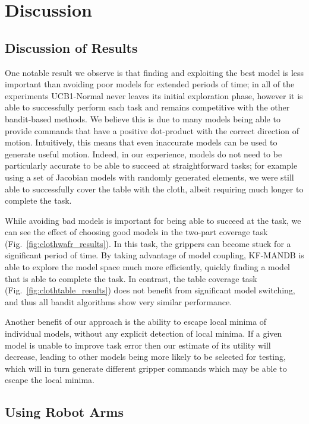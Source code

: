 \section{Discussion}

\subsection{Discussion of Results}

One notable result we observe is that finding and exploiting the best model is less important than avoiding poor models for extended periods of time; in all of the experiments UCB1-Normal never leaves its initial exploration phase, however it is able to successfully perform each task and remains competitive with the other bandit-based methods. We believe this is due to many models being able to provide commands that have a positive dot-product with the correct direction of motion. Intuitively, this means that even inaccurate models can be used to generate useful motion. Indeed, in our experience, models do not need to be particularly accurate to be able to succeed at straightforward tasks; for example using a set of Jacobian models with randomly generated elements, we were still able to successfully cover the table with the cloth, albeit requiring much longer to complete the task.

While avoiding bad models is important for being able to succeed at the task, we can see the effect of choosing good models in the two-part coverage task (Fig.~\ref{fig:clothwafr_results}). In this task, the grippers can become stuck for a significant period of time. By taking advantage of model coupling, KF-MANDB is able to explore the model space much more efficiently, quickly finding a model that is able to complete the task. In contrast, the table coverage task (Fig.~\ref{fig:clothtable_results}) does not benefit from significant model switching, and thus all bandit algorithms show very similar performance.

Another benefit of our approach is the ability to escape local minima of individual models, without any explicit detection of local minima. If a given model is unable to improve task error then our estimate of its utility will decrease, leading to other models being more likely to be selected for testing, which will in turn generate different gripper commands which may be able to escape the local minima.

\subsection{Using Robot Arms}
\label{sec:real_robot}

